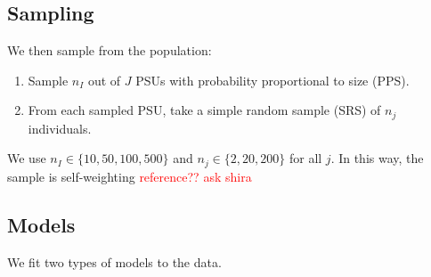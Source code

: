 \documentclass[10pt,a4paper]{article}
\newcommand*{\red}{\textcolor{red}}
\begin{document}
\subsection*{Sampling}\label{sampling}
We then sample from the population:
\begin{enumerate}
	\item Sample $n_I$ out of $J$ PSUs with probability proportional to size (PPS).
	\item From each sampled PSU, take a simple random sample (SRS) of $n_j$ individuals.
\end{enumerate}
We use $n_I \in \{10, 50, 100, 500\}$ and $n_j \in \{2, 20, 200\}$ for all $j$. In this way, the sample is self-weighting \red{reference?? ask shira}

\subsection*{Models}\label{models}
We fit two types of models to the data.
\end{document}
